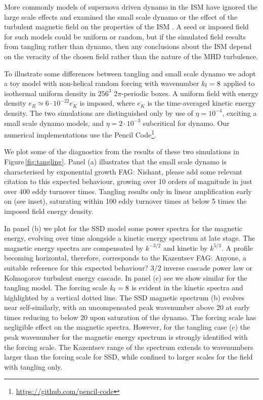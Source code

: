 \documentclass[preprint2]{aastex63}
\newcommand\kf{k_{\rm f} }
\newcommand{\fag}[1]{\textcolor{midgreen}{FAG: #1}}
\begin{document}
More commonly models of supernova driven dynamo in the ISM have ignored the 
large scale effects and examined the small scale dynamo or the effect of the
turbulent magnetic field on the properties of the ISM
\citep[e.g.,][]{BKMM04,BalKim05,MacLow:2005}.
A seed or imposed field for such models could be uniform or random, but if the
simulated field results from tangling rather than dynamo, then any conclusions
about the ISM depend on the veracity of the chosen field rather than the 
nature of the MHD turbulence.

To illustrate some differences between tangling and small scale dynamo we adopt
a toy model with non-helical random forcing with wavenumber $\kf=8$ applied to
isothermal uniform density in $256^3$ $2\pi$-periodic boxes.
A uniform field with energy density $e_B\simeq6\cdot10^{-22}\overline{e_K}$ is
imposed, where $\overline{e_K}$ is the time-averaged kinetic energy density.
The two simulations are distinguished only by use of $\eta=10^{-4}$, exciting a 
small scale dynamo models, and $\eta=2\cdot10^{-3}$ subcritical for dynamo.
Our numerical implementations use the {\sc Pencil Code}\footnote{
\url{https://github.com/pencil-code}}.

We plot some of the diagnostics from the results of these two simulations in 
Figure\,\ref{fig:tangling}.
Panel (a) illustrates that the small scale dynamo 
is characterised by exponential growth \fag{Nishant, please add some relevant citation to this expected behaviour}, growing over 10 orders of magnitude in 
just over 400 eddy turnover times.
Tangling results only in linear amplification
early on (see inset), saturating within 100 eddy turnover times at below 5 times
the imposed field energy density.

In panel (b) we plot for the SSD model some power spectra for the magnetic
energy, evolving over time alongside a kinetic energy spectrum at late stage.
The magnetic energy spectra are compensated by $k^{-3/2}$ and kinetic by
$k^{5/3}$.
A profile becoming horizontal, therefore, corresponds to the Kazentsev 
\fag{Anyone, a suitable reference for this expected behaviour?} $3/2$ inverse
cascade power law or Kolmogorov turbulent energy cascade.
In panel (c) see we show similar for the tangling model.
The forcing scale $\kf=8$ is evident in the kinetic spectra and highlighted by 
a vertical dotted line.
The SSD magnetic spectrum (b) evolves near self-similarly, with an 
uncompensated peak
wavenumber above 20 at early times reducing to below 20 upon saturation of the
dynamo.
The forcing scale has negligible effect on the magnetic spectra.
However, for the tangling case (c) the peak wavenumber for the magnetic energy
spectrum is strongly identified with the forcing scale.
The Kazentsev range of the spectrum extends to wavenumbers larger than the 
forcing scale for SSD, while confined to larger scales for the field with
tangling only. 
\end{document}
